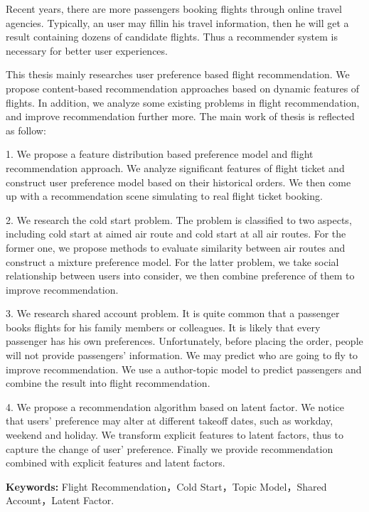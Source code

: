 \begin{englishabstract}
Recent years, there are more passengers booking flights through online travel agencies. Typically, an user may fillin his travel information, then he will get a result containing dozens of candidate flights. Thus a recommender system is necessary for better user experiences.

This thesis mainly researches user preference based flight recommendation. We propose content-based recommendation approaches based on dynamic features of flights. In addition, we analyze some existing problems in flight recommendation, and improve recommendation further more. The main work of thesis is reflected as follow:

1. We propose a feature distribution based preference model and flight recommendation approach. We analyze significant features of flight ticket and construct user preference model based on their historical orders. We then come up with a recommendation scene simulating to real flight ticket booking.

2. We research the cold start problem. The problem is classified to two aspects, including cold start at aimed air route and cold start at all air routes. For the former one, we propose methods to evaluate similarity between air routes and construct a mixture preference model. For the latter problem, we take social relationship between users into consider, we then combine preference of them to improve recommendation.

3. We research shared account problem. It is quite common that a passenger books flights for his family members or colleagues. It is likely that every passenger has his own preferences. Unfortunately, before placing the order, people will not provide passengers' information. We may predict who are going to fly to improve recommendation. We use a author-topic model to predict passengers and combine the result into flight recommendation.

4. We propose a recommendation algorithm based on latent factor. We notice that users' preference may alter at different takeoff dates, such as workday, weekend and holiday. We transform explicit features to latent factors, thus to capture the change of user' preference. Finally we provide recommendation combined with explicit features and latent factors.


\textbf{Keywords:} Flight Recommendation，Cold Start，Topic Model，Shared Account，Latent Factor.
\end{englishabstract}

